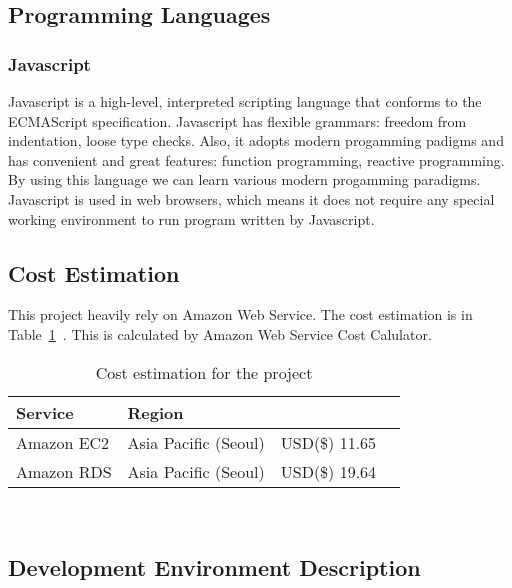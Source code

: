 \documentclass[conference,compsoc]{IEEEtran}
\begin{document}
\subsection{Programming Languages}

\subsubsection{Javascript}

Javascript is a high-level, interpreted scripting language that conforms to the ECMAScript specification. Javascript has flexible grammars: freedom from indentation, loose type checks. Also, it adopts modern progamming padigms and has convenient and great features: function programming, reactive programming. By using this language we can learn various modern progamming paradigms. Javascript is used in web browsers, which means it does not require any special working environment to run program written by Javascript.

\subsection{Cost Estimation}

This project heavily rely on Amazon Web Service. The cost estimation is in Table~\ref{tab:table2}\ . This is calculated by Amazon Web Service Cost Calulator.

\begin{table}[h] {\renewcommand\arraystretch{1.25}
\begin{tabular}{|l|l|l|l|} \hline
\bf Service & \bf Region & \bf \multicolumn{1}{l}{Cost(Monthly)} \\ \hline

Amazon EC2 & Asia Pacific (Seoul) & \multicolumn{1}{p{3.3cm}|}{\raggedright USD(\$) 11.65} \\ \hline
Amazon RDS & Asia Pacific (Seoul) & \multicolumn{1}{p{3.3cm}|}{\raggedright USD(\$) 19.64} \\ \hline

\end{tabular}} \\
\caption{Cost estimation for the project}
\label{tab:table2}
\end{table}

\subsection{Development Environment Description}
\end{document}
